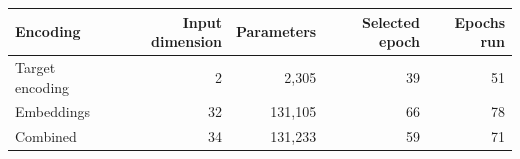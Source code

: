 \begin{center}\small
\begin{tabular}{lrrrr}
\toprule
Encoding & Input dimension & Parameters & Selected epoch & Epochs run \\
\midrule
Target encoding & 2 & 2,305 & 39 & 51 \\
Embeddings & 32 & 131,105 & 66 & 78 \\
Combined & 34 & 131,233 & 59 & 71 \\
\bottomrule
\end{tabular}\end{center}
